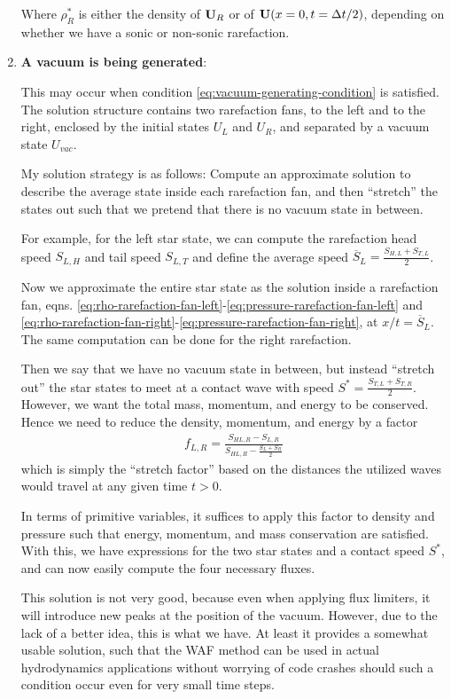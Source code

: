 \begin{enumerate}
			Where $\rho^*_R$ is either the density of $\mathbf{U}_R$ or of $\mathbf{U}(x = 0, t = \Delta t/2)$, depending on whether we have a sonic or non-sonic rarefaction.
			
	
	\item 	\textbf{A vacuum is being generated}:
	
			This may occur when condition \ref{eq:vacuum-generating-condition} is satisfied.
			The solution structure contains two rarefaction fans, to the left and to the right, enclosed by the initial states $U_L$ and $U_R$, and separated by a vacuum state $U_{vac}$.
			
			My solution strategy is as follows:
			Compute an approximate solution to describe the average state inside each rarefaction fan, and then ``stretch'' the states out such that we pretend that there is no vacuum state in between.
			
			For example, for the left star state, we can compute the rarefaction head speed $S_{L,H}$ and tail speed $S_{L,T}$ and define the average speed $\overline{S}_L = \frac{S_{H,L} + S_{T,L}}{2}$.
			
			Now we approximate the entire star state as the solution inside a rarefaction fan, eqns. \ref{eq:rho-rarefaction-fan-left}-\ref{eq:pressure-rarefaction-fan-left} and \ref{eq:rho-rarefaction-fan-right}-\ref{eq:pressure-rarefaction-fan-right}, at $x/t = \overline{S}_L$.
			The same computation can be done for the right rarefaction.
			
			Then we say that we have no vacuum state in between, but instead ``stretch out'' the star states to meet at a contact wave with speed $S^* = \frac{S_{T,L} + S_{T,R}}{2}$.
			However, we want the total mass, momentum, and energy to be conserved.
			Hence we need to reduce the density, momentum, and energy by a factor
			\begin{align*}
				f_{L,R} = \frac{S_{HL,R} - S_{L,R}}{S_{HL,R} - \frac{S_L + S_R}{2}}
			\end{align*}
			which is simply the ``stretch factor'' based on the distances the utilized waves would travel at any given time $t > 0 $.
			
			In terms of primitive variables, it suffices to apply this factor to density and pressure such that energy, momentum, and mass conservation are satisfied.
			With this, we have expressions for the two star states and a contact speed $S^*$, and can now easily compute the four necessary fluxes.
			
			This solution is not very good, because even when applying flux limiters, it will introduce new peaks at the position of the vacuum.
			However, due to the lack of a better idea, this is what we have.
			At least it provides a somewhat usable solution, such that the WAF method can be used in actual hydrodynamics applications without worrying of code crashes should such a condition occur even for very small time steps.
			

\end{enumerate}
